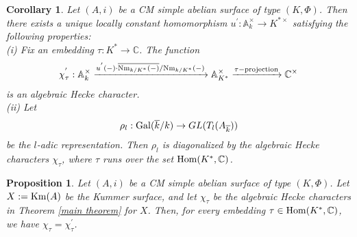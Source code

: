 \documentclass[reqno,a4paper,11pt]{amsart}
\newtheorem{prop}[dfn]{Proposition}
\newtheorem{cor}[dfn]{Corollary}
\theoremstyle{definition}
\theoremstyle{definition}
\begin{document}
      \begin{cor}\label{simple cm1} Let $(A, i)$ be a CM simple abelian surface of type $(K, \Phi)$. Then there exists a unique locally constant homomorphism $u^{'}: \mathbb{A}^{\times}_{k}\to K^{\ast\times }$ satisfying the following properties:
          \\\indent (i) Fix an embedding $\tau: K^{\ast}\to \mathbb{C}$. The function
          \begin{align}
              \chi^{'}_{\tau}: \mathbb{A}^{\times}_{k}\xrightarrow{u^{'}(-)\cdot \overline{{\rm Nm}_{k/K^{\ast}}(-)}/{\rm Nm}_{k/K^{\ast}}(-)}\mathbb{A}^{\times}_{K^{\ast}} \xrightarrow{\tau-{\rm projection}}\mathbb{C}^{\times}\notag 
          \end{align}
          is an algebraic Hecke character.
          \\\indent (ii) Let 
          \begin{align}
              \rho_{l}: {\rm Gal}(\overline{k}/k)\to GL(T_{l}(A_{\overline{k}})) \notag 
          \end{align}
          be the $l$-adic representation. Then $\rho_{l}$ is diagonalized by the algebraic Hecke characters $\chi_{\tau}$, where $\tau$ runs over the set ${\rm Hom}(K^{\ast}, \mathbb{C})$.
      \end{cor}
      \begin{prop}\label{onegai} Let $(A, i)$ be a CM simple abelian surface of type $(K, \Phi)$. Let $X:={\rm Km}(A)$ be the Kummer surface, and let $\chi_{\tau}$ be the algebraic Hecke characters in Theorem \ref{main theorem} for $X$. 
          Then, for every embedding $\tau\in {\rm Hom}(K^{\ast}, \mathbb{C})$, we have  $\chi_{\tau}=\chi^{'}_{\tau}$. 
      \end{prop}
\end{document}
